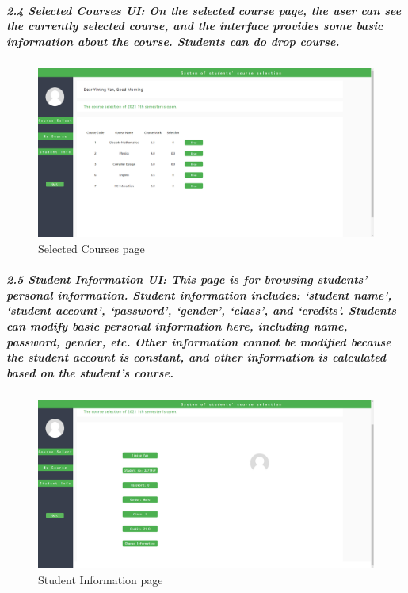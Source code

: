 \documentclass[12pt]{article}
\begin{document}
\subparagraph{2.4 Selected Courses UI: On the selected course page, the user can see the currently selected course, and the interface provides some basic information about the course. Students can do drop course.}

\begin{figure}[h]
\centering
\includegraphics[width=14cm]{./UI_mc.png}
Selected Courses page
\end{figure}

\newpage

\subparagraph{2.5 Student Information UI: This page is for browsing students’ personal information. Student information includes: ‘student name’, ‘student account’, ‘password’, ‘gender’, ‘class’, and ‘credits’. Students can modify basic personal information here, including name, password, gender, etc. Other information cannot be modified because the student account is constant, and other information is calculated based on the student's course. }

\begin{figure}[h]
\centering
\includegraphics[width=14cm]{./UI_si.png}
Student Information page
\end{figure}

\newpage
 
\end{document}

